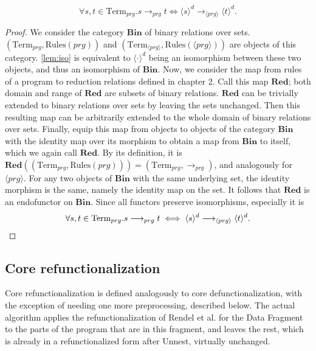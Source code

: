 \begin{lemma}[Bisimulation]
\[
\forall s,t \in \textrm{Term}_{prg}. s \longrightarrow_{prg} t \iff \langle s \rangle^d \longrightarrow_{\langle prg \rangle} \langle t \rangle^d.
\]
\begin{proof}
We consider the category $\mathbf{Bin}$ of binary relations over sets. $(\textrm{Term}_{prg}, \textrm{Rules}({prg}))$ and $(\textrm{Term}_{\langle prg \rangle}, \textrm{Rules}({\langle prg \rangle}))$ are objects of this category. \autoref{lem:iso} is equivalent to $\langle \cdot \rangle^d$ being an isomorphism between these two objects, and thus an isomorphism of $\mathbf{Bin}$. Now, we consider the map from rules of a program to reduction relations defined in chapter 2. Call this map $\mathbf{Red}$; both domain and range of $\mathbf{Red}$ are subsets of binary relations. $\mathbf{Red}$ can be trivially extended to binary relations over sets by leaving the sets unchanged. Then this resulting map can be arbitrarily extended to the whole domain of binary relations over sets. Finally, equip this map from objects to objects of the category $\mathbf{Bin}$ with the identity map over its morphism to obtain a map from $\mathbf{Bin}$ to itself, which we again call $\mathbf{Red}$. By its definition, it is $\mathbf{Red}((\textrm{Term}_{prg}, \textrm{Rules}({prg}))) = (\textrm{Term}_{prg}, \longrightarrow_{prg})$, and analogously for $\langle prg \rangle$. For any two objects of $\mathbf{Bin}$ with the same underlying set, the identity morphism is the same, namely the identity map on the set. It follows that $\mathbf{Red}$ is an endofunctor on $\mathbf{Bin}$. Since all functors preserve isomorphisms, especially it is
\[
\forall s,t \in \textrm{Term}_{prg}. s \longrightarrow_{prg} t \iff \langle s \rangle^d \longrightarrow_{\langle prg \rangle} \langle t \rangle^d. \qedhere
\]
\end{proof}
\end{lemma}

\subsection{Core refunctionalization}

Core refunctionalization is defined analogously to core defunctionalization, with the exception of needing one more preprocessing, described below. The actual algorithm applies the refunctionalization of Rendel et al. for the Data Fragment to the parts of the program that are in this fragment, and leaves the rest, which is already in a refunctionalized form after \textsf{Unnest}, virtually unchanged. 

